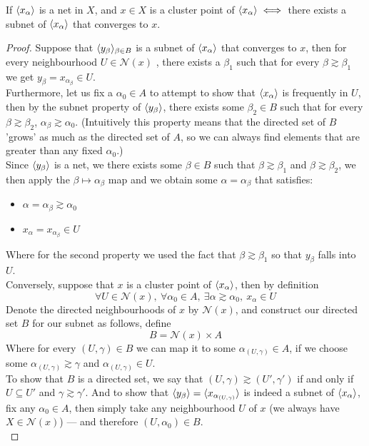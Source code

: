 \documentclass[../../main.tex]{subfiles}
\begin{document}
\newcommand{\xa}{\abrackets{x_\alpha}} %
\newcommand{\n}[1]{\mathcal{N}({#1})} %
\begin{wts}
If $\xa$ is a net in $X$, and $x\in X$ is a cluster point of $\xa\iff$ there exists a subnet of $\xa$ that converges to $x$.
\end{wts}
\begin{proof}
Suppose that $\langle {y_\beta} \rangle_{\beta\in B}$ is a subnet of $\xa$ that converges to $x$, then for every neighbourhood $U\in\n{x}$ , there exists a $\beta_1$ such that for every $\beta\gtrsim\beta_1$ we get $y_\beta = x_{\alpha_\beta}\in U$.\\

Furthermore, let us fix a $\alpha_0\in A$ to attempt to show that $\xa$ is frequently in $U$, then by the subnet property of $\langle {y_\beta} \rangle$, there exists some $\beta_2\in B$ such that for every $\beta\gtrsim\beta_2$, $\alpha_\beta\gtrsim \alpha_0$. (Intuitively this property means that the directed set of $B$ 'grows' as much as the directed set of $A$, so we can always find elements that are greater than any fixed $\alpha_0$.)\\

Since $\langle {y_\beta} \rangle$ is a net, we there exists some $\beta\in B$ such that $\beta\gtrsim\beta_1$ and $\beta\gtrsim\beta_2$, we then apply the $\beta\mapsto \alpha_\beta$ map and we obtain some $\alpha=\alpha_\beta$ that satisfies:
\begin{itemize}
    \item $\alpha=\alpha_\beta\gtrsim\alpha_0$
    \item $x_\alpha = x_{\alpha_\beta}\in U$
\end{itemize}
Where for the second property we used the fact that $\beta\gtrsim\beta_1$ so that $y_\beta$ falls into $U$.\\

Conversely, suppose that $x$ is a cluster point of $\xa$, then by definition
\[
\forall U\in\n{x},\:\forall\alpha_0\in A,\:\exists\alpha\gtrsim\alpha_0,\:x_\alpha\in U
\]
Denote the directed neighbourhoods of $x$ by $\n{x}$, and construct our directed set $B$ for our subnet as follows, define
\[
B = \n{x}\times A
\]
Where for every $(U,\gamma)\in B$ we can map it to some $\alpha_{(U,\gamma)}\in A$, if we choose some $\alpha_{(U,\gamma)}\gtrsim\gamma$ and $\alpha_{(U,\gamma)}\in U$. \\

To show that $B$ is a directed set, we say that $(U,\gamma)\gtrsim (U',\gamma')$ if and only if $U\subseteq U'$ and $\gamma\gtrsim\gamma'$. And to show that $\langle {y_\beta} \rangle = \langle {x_{\alpha_{(U,\gamma)}}} \rangle$ is indeed a subnet of $\xa$, fix any $\alpha_0\in A$, then simply take any neighbourhood $U$ of $x$ (we always have $X\in\n{x}$) — and therefore $(U,\alpha_0)\in B$.\\


\end{proof}
\end{document}
